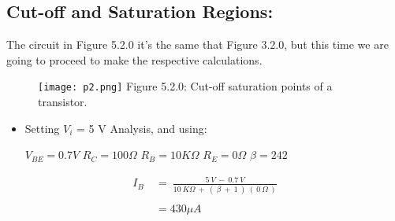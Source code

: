 \subsection{Cut-off and Saturation Regions:}

\setcounter{equation}{0}

The circuit in Figure 5.2.0 it's the same that Figure 3.2.0, but this time we are going to proceed to make the respective calculations. \hfill 

\begin{figure}[H]
\texttt{[image: p2.png]}
\centering \linebreak \linebreak Figure 5.2.0: Cut-off saturation points of a transistor.
\end{figure} \hfill 

{\bfseries\itshape
\begin{itemize}
\item Setting $V_{i}$ = 5 V Analysis, and using:
\begin{tasks}
\task $V_{BE} =  0.7 V$
\task $R_{C} = 100 \Omega$ 
\task $R_{B} = 10K \Omega$ 
\task $R_{E} = 0 \Omega$ 
\task $\beta = 242$ 
\end{tasks}
\end{itemize}} \hfill \break

{\bfseries\itshape{}} 

\begin{flushright}
{\bfseries\itshape{}} \hfill \break
\end{flushright}

\begin{ceqn}
\begin{align}
I_{B}\ &=\ \frac{5\ V\ -\ 0.7\ V}{10\ K\Omega\ +\ (\ \beta\ +\ 1\ )\ (\ 0\ \Omega\ )} \\ \\
&= 430 \mu A
\end{align}
\end{ceqn} \hfill \break

{\bfseries\itshape{}} 

